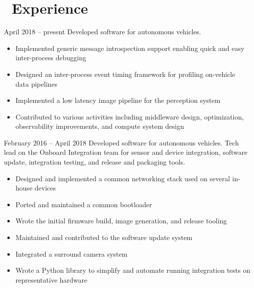 \documentclass{resume}
\begin{document}

 
\section{\faWrench\ Experience}
          {April 2018 -- present}
Developed software for autonomous vehicles.
\begin{itemize}
  \item Implemented generic message introspection support enabling quick and easy inter-process debugging
  \item Designed an inter-process event timing framework for profiling on-vehicle data pipelines
  \item Implemented a low latency image pipeline for the perception system
  \item Contributed to various activities including middleware design, optimization,
      observability improvements, and compute system design
\end{itemize}
\vspace{3mm}

          {February 2016 -- April 2018}
Developed software for autonomous vehicles. Tech lead on the Onboard Integration team for sensor
and device integration, software update, integration testing, and release and packaging tools.
\begin{itemize}
  \item Designed and implemented a common networking stack used on several in-house devices
  \item Ported and maintained a common bootloader
  \item Wrote the initial firmware build, image generation, and release tooling
  \item Maintained and contributed to the software update system
  \item Integrated a surround camera system
  \item Wrote a Python library to simplify and automate running integration tests on representative hardware
\end{itemize}
\vspace{3mm}
\end{document}
